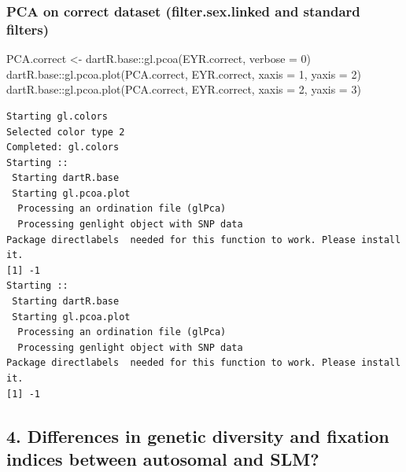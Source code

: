 \documentclass[
  letterpaper,
  DIV=11,
  numbers=noendperiod]{scrreprt}
\newenvironment{Shaded}{\begin{snugshade}}{\end{snugshade}}
\newcommand{\AttributeTok}[1]{\textcolor[rgb]{0.49,0.56,0.16}{#1}}
\newcommand{\DecValTok}[1]{\textcolor[rgb]{0.25,0.63,0.44}{#1}}
\newcommand{\FunctionTok}[1]{\textcolor[rgb]{0.02,0.16,0.49}{#1}}
\newcommand{\NormalTok}[1]{\textcolor[rgb]{0.00,0.44,0.13}{#1}}
\newcommand{\OtherTok}[1]{\textcolor[rgb]{0.00,0.44,0.13}{#1}}
\newcommand{\SpecialCharTok}[1]{\textcolor[rgb]{0.25,0.44,0.63}{#1}}
\begin{document}
\hypertarget{pca-on-correct-dataset-filter.sex.linked-and-standard-filters}{%
\subsubsection*{PCA on correct dataset (filter.sex.linked and standard
filters)}\label{pca-on-correct-dataset-filter.sex.linked-and-standard-filters}}

\begin{Shaded}
\begin{Highlighting}[]
\NormalTok{PCA.correct }\OtherTok{\textless{}{-}}\NormalTok{ dartR.base}\SpecialCharTok{::}\FunctionTok{gl.pcoa}\NormalTok{(EYR.correct, }\AttributeTok{verbose =} \DecValTok{0}\NormalTok{)}
\NormalTok{dartR.base}\SpecialCharTok{::}\FunctionTok{gl.pcoa.plot}\NormalTok{(PCA.correct, EYR.correct, }\AttributeTok{xaxis =} \DecValTok{1}\NormalTok{, }\AttributeTok{yaxis =} \DecValTok{2}\NormalTok{)}
\NormalTok{dartR.base}\SpecialCharTok{::}\FunctionTok{gl.pcoa.plot}\NormalTok{(PCA.correct, EYR.correct, }\AttributeTok{xaxis =} \DecValTok{2}\NormalTok{, }\AttributeTok{yaxis =} \DecValTok{3}\NormalTok{)}
\end{Highlighting}
\end{Shaded}

\begin{verbatim}
Starting gl.colors 
Selected color type 2 
Completed: gl.colors 
Starting :: 
 Starting dartR.base 
 Starting gl.pcoa.plot 
  Processing an ordination file (glPca)
  Processing genlight object with SNP data
Package directlabels  needed for this function to work. Please install it.
[1] -1
Starting :: 
 Starting dartR.base 
 Starting gl.pcoa.plot 
  Processing an ordination file (glPca)
  Processing genlight object with SNP data
Package directlabels  needed for this function to work. Please install it.
[1] -1
\end{verbatim}

\hypertarget{differences-in-genetic-diversity-and-fixation-indices-between-autosomal-and-slm-1}{%
\subsection*{4. Differences in genetic diversity and fixation indices
between autosomal and
SLM?}\label{differences-in-genetic-diversity-and-fixation-indices-between-autosomal-and-slm-1}}
\end{document}
